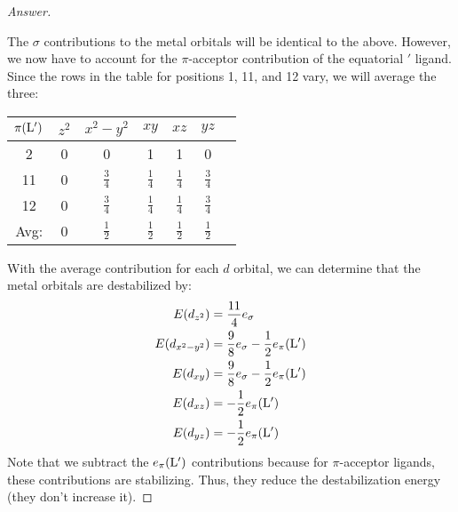 \documentclass[../psets.tex]{subfiles}
\begin{document}
\begin{enumerate}[label={\Roman*)}]
\begin{enumerate}[label={\textbf{10.\arabic*}}]
\begin{enumerate}[label={\textbf{\alph*.}}]
\begin{enumerate}[label={(\arabic*)}]
\begin{proof}[Answer]
\begin{center}
                    \end{center}
                    \vspace{1em}
                    The $\sigma$ contributions to the metal orbitals will be identical to the above. However, we now have to account for the $\pi$-acceptor contribution of the equatorial $'$ ligand. Since the rows in the table for positions 1, 11, and 12 vary, we will average the three:
                    \begin{center}
                        \small
                        \renewcommand{\arraystretch}{1.4}
                        \begin{tabular}{c|cccccc}
                            $\pi(\ce{L}')$ & $z^2$ & $x^2-y^2$ & $xy$ & $xz$ & $yz$\\
                            \hline
                            2 & 0 & 0 & 1 & 1 & 0\\
                            11 & 0 & $\frac{3}{4}$ & $\frac{1}{4}$ & $\frac{1}{4}$ & $\frac{3}{4}$\\
                            12 & 0 & $\frac{3}{4}$ & $\frac{1}{4}$ & $\frac{1}{4}$ & $\frac{3}{4}$\\
                            \hline
                            Avg: & 0 & $\frac{1}{2}$ & $\frac{1}{2}$ & $\frac{1}{2}$ & $\frac{1}{2}$\\
                        \end{tabular}
                    \end{center}
                    With the average contribution for each $d$ orbital, we can determine that the metal orbitals are destabilized by:
                    \begin{align*}
                        E(d_{z^2}) &= \frac{11}{4}e_\sigma\\
                        E(d_{x^2-y^2}) &= \frac{9}{8}e_\sigma-\frac{1}{2}e_\pi(\ce{L}')\\
                        E(d_{xy}) &= \frac{9}{8}e_\sigma-\frac{1}{2}e_\pi(\ce{L}')\\
                        E(d_{xz}) &= -\frac{1}{2}e_\pi(\ce{L}')\\
                        E(d_{yz}) &= -\frac{1}{2}e_\pi(\ce{L}')
                    \end{align*}
                    Note that we subtract the $e_\pi(\ce{L}')$ contributions because for $\pi$-acceptor ligands, these contributions are stabilizing. Thus, they reduce the destabilization energy (they don't increase it).
                \end{proof}

\end{enumerate}
\end{enumerate}
\end{enumerate}
\end{enumerate}
\end{document}
